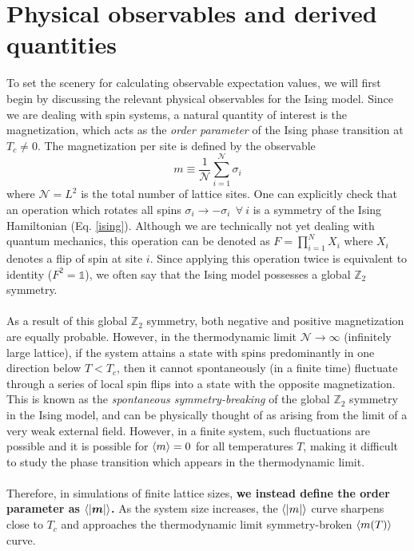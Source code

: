 \documentclass[../journal_main.tex]{subfiles}
\begin{document}
\section{Physical observables and derived quantities}
To set the scenery for calculating observable expectation values, we will first begin by discussing the relevant physical observables for the Ising model. Since we are dealing with spin systems, a natural quantity of interest is the magnetization, which acts as the \textit{order parameter} of the Ising phase transition at $T_c \neq 0$. The magnetization per site is defined by the observable
\begin{equation}
    m \equiv \frac{1}{\mathcal{N}} \sum_{i=1}^{\mathcal{N}} \sigma_i
\end{equation} 
where $\mathcal{N}=L^2$ is the total number of lattice sites. One can explicitly check that an operation which rotates all spins $\sigma_i \to -\sigma_i \:\: \forall \: i$ is a symmetry of the Ising Hamiltonian (Eq. \eqref{ising}). Although we are technically not yet dealing with quantum mechanics, this operation can be denoted as $F = \prod_{i=1}^N X_i$ where $X_i$ denotes a flip of spin at site $i$. Since applying this operation twice is equivalent to identity ($F^2 = \mathds{1}$), we often say that the Ising model possesses a global $\mathbb{Z}_2$ symmetry.~\\~\\
As a result of this global $\mathbb{Z}_2$ symmetry, both negative and positive magnetization are equally probable. However, in the thermodynamic limit $\mathcal{N} \to \infty$ (infinitely large lattice), if the system attains a state with spins predominantly in one direction below $T < T_c$, then it cannot spontaneously (in a finite time) fluctuate through a series of local spin flips into a state with the opposite magnetization. This is known as the \textit{spontaneous symmetry-breaking} of the global $\mathbb{Z}_2$ symmetry in the Ising model, and can be physically thought of as arising from the limit of a very weak external field. However, in a finite system, such fluctuations are possible and it is possible for $\expval{m} = 0$ for all temperatures $T$, making it difficult to study the phase transition which appears in the thermodynamic limit.~\\~\\
Therefore, in simulations of finite lattice sizes, \textbf{we instead define the order parameter as} ${\expval{|\boldsymbol{m}|}}$\textbf{.} As the system size increases, the $\expval{|m|}$ curve sharpens close to $T_c$ and approaches the thermodynamic limit symmetry-broken $\expval{m(T)}$ curve.~\\~\\
\end{document}
